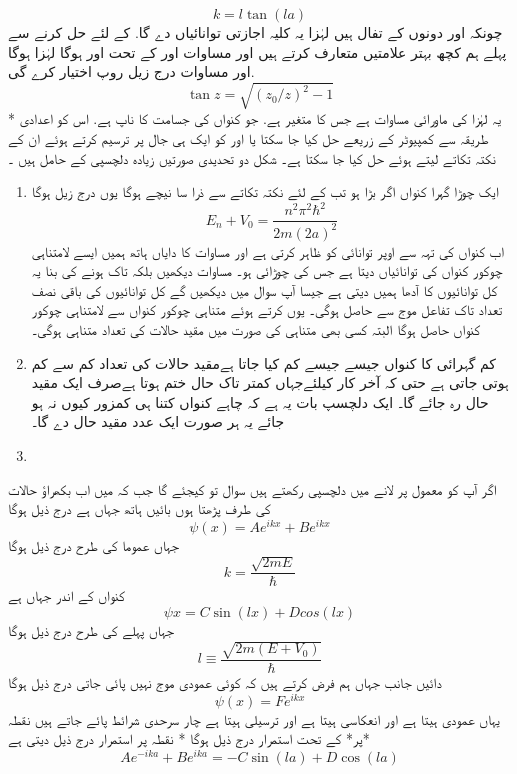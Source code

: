 \[k=l\tan(la)  \]
 چونکہ   اور  دونوں  کے تفال ہیں لہٰزا یہ کلیہ اجازتی توانائیاں دے گا.   کے لئے حل کرنے سے پہلے ہم کچھ بہتر علامتیں متعارف کرتے ہیں اور 
مساوات  اور کے تحت  اور ہوگا لہٰزا  ہوگا اور مساوات 
 درج زیل روپ اختیار کرے گی.
\[\tan z=\sqrt{(z_{0}/z)^{2}-1} \]
* یہ  لہٰزا  کی ماورائی مساوات ہے جس کا متغیر  ہے. جو کنواں کی جسامت کا ناپ ہے. اس کو اعدادی طریقہ سے کمپیوٹر کے زریعے حل کیا جا سکتا یا  اور  کو ایک ہی جال پر ترسیم کرتے ہوئے ان کے نکتہ تکاتے لیتے ہوئے  حل کیا جا سکتا ہے۔
 شکل    دو تحدیدی صورتیں زیادہ دلچسپی کے حامل ہیں ۔ 
\begin{enumerate}
\item ایک چوڑا گہرا کنواں
 اگر  بڑا ہو تب کے لئے نکتہ تکاتے سے ذرا سا نیچے ہوگا یوں درج زیل ہوگا
\[E_{n}+V_{0}=\frac{n^{2}\pi^{2}\hbar^{2}}{2m(2a)^{2}} \]
اب کنواں کی تہہ سے اوپر توانائی کو ظاہر کرتی ہے اور مساوات کا دایاں ہاتھ ہمیں ایسے لامتناہی چوکور کنواں کی توانائیاں دیتا ہے جس کی چوڑائی  ہو۔
 مساوات دیکھیں بلکہ  تاک ہونے کی بنا یہ کل توانائیوں کا آدھا ہمیں دیتی ہے جیسا آپ سوال  میں دیکھیں گے کل توانائیوں کی باقی نصف تعداد تاک تفاعل موج سے حاصل ہوگی۔ 
 یوں کرتے ہوئے متناہی چوکور کنواں سے لامتناہی چوکور کنواں حاصل ہوگا البتہ کسی بھی متناہی  کی صورت میں مقید حالات کی تعداد متناہی ہوگی۔ 
\item  کم گہرائی کا کنواں 
 جیسے جیسے کم کیا جاتا ہےمقید حالات کی تعداد کم سے کم ہوتی جاتی ہے  حتی کہ آخر کار  کیلئےجہاں کمتر تاک حال ختم ہوتا ہےصرف ایک  مقید حال رہ جائے گا۔   ایک دلچسپ بات یہ ہے کہ چاہے کنواں کتنا ہی کمزور کیوں نہ ہو جائے یہ ہر صورت ایک عدد مقید حال دے گا۔ 

\item
\end{enumerate}





 اگر آپ 
 کو معمول پر لانے میں دلچسپی رکھتے ہیں سوال  تو کیجئے گا جب کہ میں اب بکھراؤ حالات  کی طرف پڑھتا ہوں بائیں ہاتھ جہاں ہے درج ذیل ہوگا 
\[\psi(x)=Ae^{ikx}+Be^{ikx} \]
 جہاں عموما کی طرح درج ذیل ہوگا\[k=\frac{\sqrt{2mE}}{\hbar} \]  کنواں کے اندر جہاں  ہے
\[\psi{x}=C\sin(lx)+Dcos(lx) \]
  جہاں پہلے کی طرح درج ذیل ہوگا \[l\equiv \frac{\sqrt{2m(E+V_{0})}}{\hbar} \]  دائیں جانب جہاں ہم فرض کرتے ہیں کہ کوئی عمودی موج نہیں پائی جاتی  درج ذیل ہوگا \[\psi(x)=Fe^{ikx} \] یہاں عمودی  ہیتا ہے اور انعکاسی ہیتا  ہے اور ترسیلی ہیتا   ہے چار سرحدی شرائط پائے جاتے ہیں نقطہ *پر* کے تحت استمرار درج ذیل ہوگا *  
نقطہ  پر استمرار درج ذیل دیتی ہے
\[Ae^{-ika}+Be^{ika} = -C\sin(la)+D\cos(la) \]

